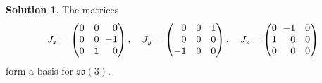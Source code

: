 \documentclass[11pt, a4paper]{report}
\theoremstyle{definition}
\newtheorem{sol}{Solution}[part]
\newcommand*{\ralminus}{\ensuremath\:\, \mathllap{-}}
\begin{document}
\begin{sol}

The matrices
\[
    J_x =
        \begin{pmatrix*}[r]
            0 & 0 & 0 \\
            0 & 0 & \ralminus 1 \\
            0 & 1 & 0 \\
        \end{pmatrix*}, \quad
    J_y =
        \begin{pmatrix*}[r]
            0  & 0 & 1 \\
            0  & 0 & 0 \\
            -1 & 0 & 0 \\
        \end{pmatrix*}, \quad
    J_z =
        \begin{pmatrix*}[r]
            0 & \ralminus 1 & 0 \\
            1 & 0 & 0 \\
            0 & 0 & 0 \\
        \end{pmatrix*}
\]
form a basis for $\mathfrak{so}(3)$.


\end{sol}
\end{document}
